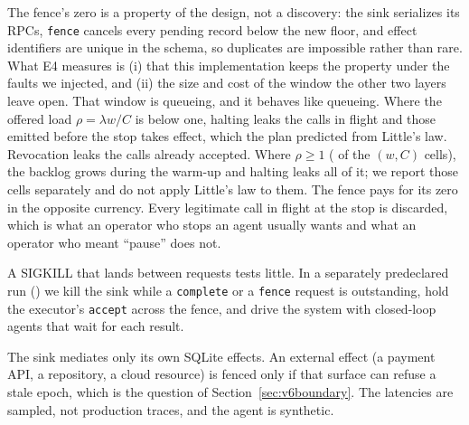  The fence's zero is a property of the design, not a discovery: the sink serializes its
RPCs, \texttt{fence} cancels every pending record below the new floor, and effect identifiers are unique in the schema,
so duplicates are impossible rather than rare. What E4 measures is (i) that this implementation keeps the property
under the faults we injected, and (ii) the size and cost of the window the other two layers leave open. That window is
queueing, and it behaves like queueing. Where the offered load \(\rho = \lambda w / C\) is below one, halting leaks
the calls in flight and those emitted before the stop takes effect, which the plan predicted from Little's law.
\vsixLittleSentence{} Revocation leaks the calls already accepted.
Where \(\rho \ge 1\) (\vsixEFourOverloadedCells{} of the \vsixEFourWCCells{} \((w, C)\) cells), the backlog grows during the warm-up and
halting leaks all of it; we report those cells separately and do not apply Little's law to them. The fence pays for its
zero in the opposite currency. Every legitimate call in flight at the stop is discarded, which is what an operator who
stops an agent usually wants and what an operator who meant ``pause'' does not.

 A SIGKILL that lands between requests tests little. In a separately predeclared run
() we kill the sink while a \texttt{complete} or a \texttt{fence} request is
outstanding, hold the executor's \texttt{accept} across the fence, and drive the system with closed-loop agents that
wait for each result. \vsixEFourBSentence

 The sink mediates only its own SQLite effects. An external effect (a payment API, a repository, a cloud
resource) is fenced only if that surface can refuse a stale epoch, which is the question of
Section~\ref{sec:v6boundary}. The latencies are sampled, not production traces, and the agent is synthetic.
